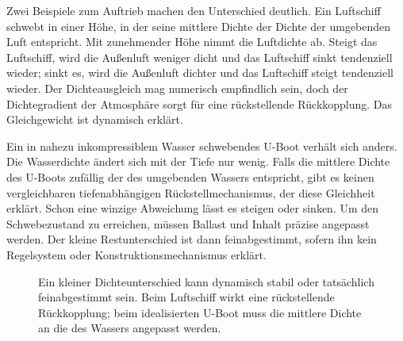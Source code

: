 Zwei Beispiele zum Auftrieb machen den Unterschied deutlich. Ein Luftschiff schwebt in einer Höhe, in der seine mittlere Dichte der Dichte der umgebenden Luft entspricht. Mit zunehmender Höhe nimmt die Luftdichte ab. Steigt das Luftschiff, wird die Außenluft weniger dicht und das Luftschiff sinkt tendenziell wieder; sinkt es, wird die Außenluft dichter und das Luftschiff steigt tendenziell wieder. Der Dichteausgleich mag numerisch empfindlich sein, doch der Dichtegradient der Atmosphäre sorgt für eine rückstellende Rückkopplung. Das Gleichgewicht ist dynamisch erklärt.

Ein in nahezu inkompressiblem Wasser schwebendes U-Boot verhält sich anders. Die Wasserdichte ändert sich mit der Tiefe nur wenig. Falls die mittlere Dichte des U-Boots zufällig der des umgebenden Wassers entspricht, gibt es keinen vergleichbaren tiefenabhängigen Rückstellmechanismus, der diese Gleichheit erklärt. Schon eine winzige Abweichung lässt es steigen oder sinken. Um den Schwebezustand zu erreichen, müssen Ballast und Inhalt präzise angepasst werden. Der kleine Restunterschied ist dann feinabgestimmt, sofern ihn kein Regelsystem oder Konstruktionsmechanismus erklärt.

\begin{figure}[ht]\centering
{}\caption{Ein kleiner Dichteunterschied kann dynamisch stabil oder tatsächlich feinabgestimmt sein. Beim Luftschiff wirkt eine rückstellende Rückkopplung; beim idealisierten U-Boot muss die mittlere Dichte an die des Wassers angepasst werden.}\label{fig:blimp-submarine}\end{figure}


